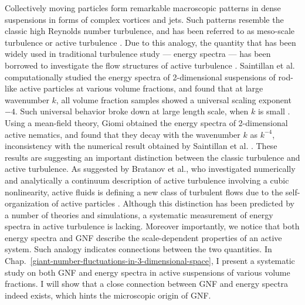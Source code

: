 Collectively moving particles form remarkable macroscopic patterns in dense suspensions in forms of complex vortices and jets. Such patterns resemble the classic high Reynolds number turbulence, and has been referred to as meso-scale turbulence or active turbulence \cite{Wensink2012}. Due to this analogy, the quantity that has been widely used in traditional turbulence study --- energy spectra --- has been borrowed to investigate the flow structures of active turbulence
\cite{Ishikawa2011, Saintillan2012, Bratanov2015, Giomi2015, Bardfalvy2019, Linkmann2019, Chatterjee2019, Skultety2020, Peng2020}.
Saintillan et al. computationally studied the energy spectra of 2-dimensional suspensions of rod-like active particles at various volume fractions, and found that at large wavenumber $k$, all volume fraction samples showed a universal scaling exponent $-4$. Such universal behavior broke down at large length scale, when $k$ is small \cite{Saintillan2012}.
Using a mean-field theory, Giomi obtained the energy spectra of 2-dimensional active nematics, and found that they decay with the wavenumber $k$ as $k^{-4}$, inconsistency with the numerical result obtained by Saintillan et al. \cite{Giomi2015}.
These results are suggesting an important distinction between the classic turbulence and active turbulence.
As suggested by Bratanov et al., who investigated numerically and analytically a continuum description of active turbulence involving a cubic nonlinearity, active fluids is defining a new class of turbulent flows due to the self-organization of active particles \cite{Bratanov2015}.
Although this distinction has been predicted by a number of theories and simulations, a systematic measurement of energy spectra in active turbulence is lacking.
Moreover importantly, we notice that both energy spectra and GNF describe the scale-dependent properties of an active system. Such analogy indicates connections between the two quantities.
In Chap.~\ref{giant-number-fluctuations-in-3-dimensional-space}, I present a systematic study on both GNF and energy spectra in active suspensions of various volume fractions. I will show that a close connection between GNF and energy spectra indeed exists, which hints the microscopic origin of GNF.

